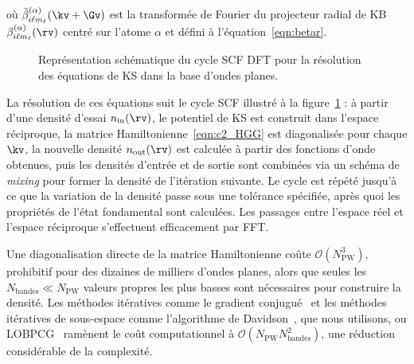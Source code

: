 où $\tilde{\beta}_{i\ell m_\ell}^{(\alpha)}(\kv+\Gv)$ est la transformée de Fourier du projecteur radial de KB $\beta_{i\ell m_\ell}^{(\alpha)}(\rv)$ centré sur l'atome $\alpha$ et défini à l'équation~\eqref{eqn:betar}.
\begin{figure}[t]
    \centering
    \hspace{2.5cm}
    
    \caption[Représentation schématique du cycle SCF DFT pour la résolution des équations de KS dans la base d'ondes planes.]{Représentation schématique du cycle SCF DFT pour la résolution des équations de KS dans la base d'ondes planes.}
    \label{fig:scf_PW}
\end{figure}

La résolution de ces équations suit le cycle SCF illustré à la figure~\ref{fig:scf_PW} : à partir d'une densité d'essai $n_\text{in}(\rv)$, le potentiel de KS est construit dans l'espace réciproque, la matrice Hamiltonienne~\eqref{eqn:c2_HGG} est diagonalisée pour chaque $\kv$, la nouvelle densité $n_\text{out}(\rv)$ est calculée à partir des fonctions d'onde obtenues, puis les densités d'entrée et de sortie sont combinées via un schéma de \textit{mixing} pour former la densité de l'itération suivante. Le cycle est répété jusqu'à ce que la variation de la densité passe sous une tolérance spécifiée, après quoi les propriétés de l'état fondamental sont calculées. Les passages entre l'espace réel et l'espace réciproque s'effectuent efficacement par FFT.

\newpage
{}

Une diagonalisation directe de la matrice Hamiltonienne coûte $\mathcal{O}(N_\text{PW}^3)$, prohibitif pour des dizaines de milliers d'ondes planes, alors que seules les $N_\text{bandes}\ll N_\text{PW}$ valeurs propres les plus basses sont nécessaires pour construire la densité. Les méthodes itératives comme le gradient conjugué~\cite{hestenesMethodsConjugateGradients} et les méthodes itératives de sous-espace comme l'algorithme de Davidson~\cite{davidsonIterativeCalculationFew1975}, que nous utilisons, ou LOBPCG~\cite{OptimalPreconditionedEigensolver} ramènent le coût computationnel à $\mathcal{O}(N_\text{PW}N_\text{bandes}^2)$, une réduction considérable de la complexité.  


